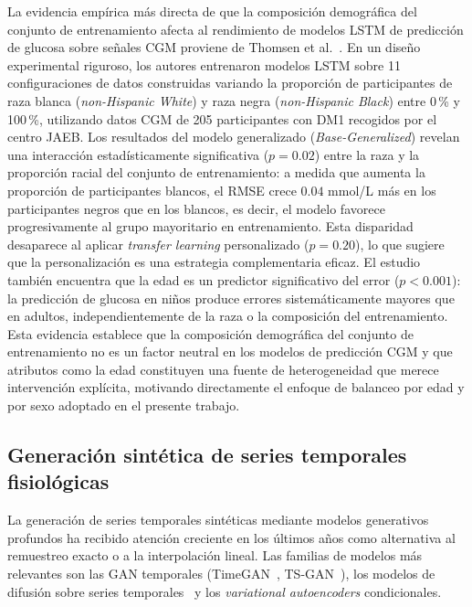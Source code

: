 La evidencia empírica más directa de que la composición demográfica del conjunto
de entrenamiento afecta al rendimiento de modelos LSTM de predicción de glucosa
sobre señales CGM proviene de Thomsen et al.~\cite{thomsen2025racial}. En un
diseño experimental riguroso, los autores entrenaron modelos LSTM sobre 11
configuraciones de datos construidas variando la proporción de participantes de
raza blanca (\emph{non-Hispanic White}) y raza negra (\emph{non-Hispanic Black})
entre 0\,\% y 100\,\%, utilizando datos CGM de 205 participantes con DM1
recogidos por el centro JAEB. Los resultados del modelo generalizado (\emph{Base-Generalized})
revelan una interacción estadísticamente significativa ($p=0.02$) entre la raza y
la proporción racial del conjunto de entrenamiento: a medida que aumenta la
proporción de participantes blancos, el RMSE crece $0.04$ mmol/L más en los
participantes negros que en los blancos, es decir, el modelo favorece
progresivamente al grupo mayoritario en entrenamiento. Esta disparidad desaparece
al aplicar \emph{transfer learning} personalizado ($p=0.20$), lo que sugiere que
la personalización es una estrategia complementaria eficaz. El estudio también
encuentra que la edad es un predictor significativo del error ($p<0.001$): la
predicción de glucosa en niños produce errores sistemáticamente mayores que en
adultos, independientemente de la raza o la composición del entrenamiento. Esta
evidencia establece que la composición demográfica del conjunto de entrenamiento
no es un factor neutral en los modelos de predicción CGM y que atributos como la
edad constituyen una fuente de heterogeneidad que merece intervención explícita,
motivando directamente el enfoque de balanceo por edad y por sexo adoptado en el
presente trabajo.

\subsection{Generación sintética de series temporales fisiológicas}
\label{subsec:generacion_sintetica_series}

La generación de series temporales sintéticas mediante modelos generativos profundos ha recibido atención creciente en los últimos años como alternativa al remuestreo exacto o a la interpolación lineal. Las familias de modelos más relevantes son las GAN temporales (TimeGAN~\cite{yoon2019timegan}, TS-GAN~\cite{dong2023tsgan}), los modelos de difusión sobre series temporales~\cite{tashiro2021csdi} y los \emph{variational autoencoders} condicionales.

